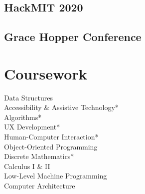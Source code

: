 \documentclass[]{hieudo-build}
\begin{document}
\begin{minipage}[t]{0.34\textwidth}
\subsection{HackMIT 2020}
\smallsectionsep
\subsection{Grace Hopper Conference}
\sectionsep

\section{Coursework}
Data Structures \\
Accessibility \& Assistive Technology* \\
Algorithms* \\
UX Development* \\
Human-Computer Interaction* \\
Object-Oriented Programming \\
Discrete Mathematics* \\
Calculus I \& II \\
Low-Level Machine Programming \\
Computer Architecture \\
\smallsectionsep
{}
\sectionsep



\sectionsep
{}

%
%
\end{minipage} 
\hfill
\end{document}
